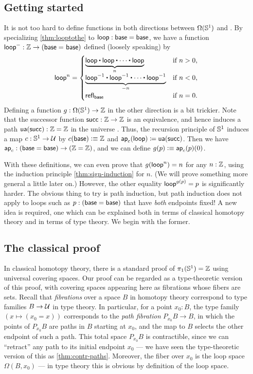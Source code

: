 \subsection{Getting started}
\label{sec:pi1s1-initial-thoughts}

It is not too hard to define functions in both directions between $\Omega(\mathbb{S}^1)$ and \Z.
By specializing \autoref{thm:looptothe} to $\mathsf{loop}:\mathsf{base}=\mathsf{base}$, we have a function $\mathsf{loop}^- : \mathbb{Z} \rightarrow (\mathsf{base} =_{} \mathsf{base})$ defined (loosely speaking) by
\[
  \lloop^n =
  \begin{cases}
    \underbrace{\lloop \ct \lloop \ct \cdots \ct \lloop}_{n}  & \text{if $n > 0$,} \\
    \underbrace{\opp \lloop \ct \opp \lloop \ct \cdots \ct \opp \lloop}_{-n} & \text{if $n < 0$,} \\
    \refl{\base} & \text{if $n = 0$.}
\end{cases}
\]
%
Defining a function $g:\Omega(\mathbb{S}^1)\to\mathbb{Z}$ in the other direction is a bit trickier.
Note that the successor function $\mathsf{succ}:\mathbb{Z}\to\mathbb{Z}$ is an equivalence, and hence induces a path $\mathsf{ua}(\mathsf{succ}):\mathbb{Z}=\mathbb{Z}$ in the universe \type.
Thus, the recursion principle of $\mathbb{S}^1$ induces a map $c:\mathbb{S}^1\to\mathcal{U}$ by $c(\mathsf{base})\vcentcolon\equiv \mathbb{Z}$ and $\mathsf{ap}_{c} (\mathsf{loop}) \coloneqq \mathsf{ua}(\mathsf{succ})$.
Then we have $\mathsf{ap}_{c} : (\mathsf{base}=\mathsf{base}) \to (\mathbb{Z}=\mathbb{Z})$, and we can define $g(p)\vcentcolon\equiv \mathsf{ap}_{c}(p)(0)$.

With these definitions, we can even prove that $g(\mathsf{loop}^n)=n$ for any $n:\mathbb{Z}$, using the induction principle \autoref{thm:sign-induction} for $n$.
(We will prove something more general a little later on.)
However, the other equality $\mathsf{loop}^{g(p)}=p$ is significantly harder.
The obvious thing to try is path induction, but path induction does not apply to loops such as $p:(\mathsf{base}=\mathsf{base})$ that have \emph{both} endpoints fixed!
A new idea is required, one which can be explained both in terms of classical homotopy theory and in terms of type theory.
We begin with the former.


\subsection{The classical proof}
\label{sec:pi1s1-classical-proof}

In classical homotopy theory, there is a standard proof of $\pi_1(\mathbb{S}^1)=\mathbb{Z}$ using universal covering spaces.
Our proof can be regarded as a type-theoretic version of this proof, with covering spaces appearing here as fibrations whose fibers are sets.
Recall that \emph{fibrations} over a space $B$ in homotopy theory correspond to type families $B\to\mathcal{U}$ in type theory.
In particular, for a point $x_0:B$, the type family $(x\mapsto (x_0=x))$ corresponds to the \emph{path fibration} $P_{x_0} B \to B$, in which the points of $P_{x_0} B$ are paths in $B$ starting at $x_0$, and the map to $B$ selects the other endpoint of such a path.
This total space $P_{x_0} B$ is contractible, since we can ``retract'' any path to its initial endpoint $x_0$ --- we have seen the type-theoretic version of this as \autoref{thm:contr-paths}.
Moreover, the fiber over $x_0$ is the loop space $\Omega(B,x_0)$ --- in type theory this is obvious by definition of the loop space.

